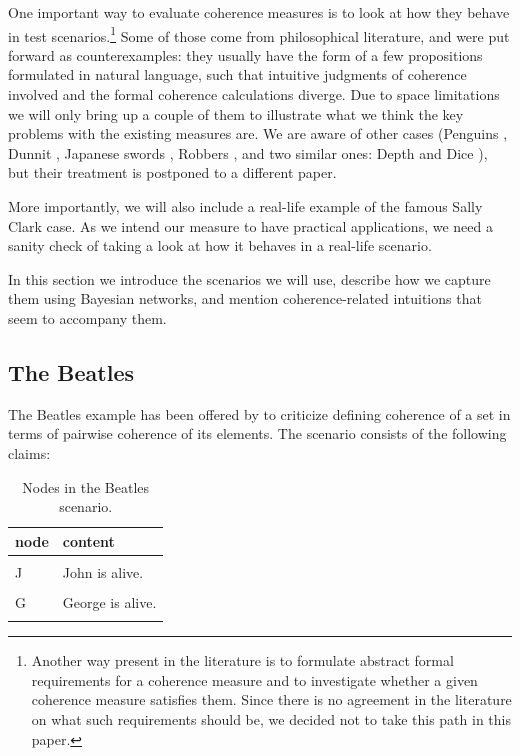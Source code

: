 \documentclass[10pt,]{scrartcl}
\begin{document}
One important way to evaluate coherence measures is to look at how they behave in test scenarios.\footnote{Another way present in the literature is to formulate abstract formal requirements for a coherence measure and to investigate whether a given coherence measure satisfies them. Since there is no agreement in the literature on what such requirements should be, we decided not to take this path in this paper.}
 Some of those come from philosophical literature, and were put forward as counterexamples: they usually have the form of a few propositions formulated in natural language, such that intuitive judgments of coherence involved and the formal coherence calculations  diverge.  Due to space limitations we will only bring up a couple of them to illustrate what we think the key problems with the existing measures are. We are aware of other cases (Penguins \citep{bovens2004bayesian,Meijs2007Alleged},  Dunnit \citep{Merricks1995}, 
Japanese swords \citep{Meijs2007Alleged}, 
Robbers \citep{Siebel2004On-Fitelsons-me},
and two similar ones: Depth and 
Dice  \citep{Akiba2000Shogenjis,Shogenji2001Reply,Schippers2019General}), but their  treatment is postponed to a different paper.

More importantly, we will also include a real-life example of the famous Sally Clark case. As we intend our measure to have practical applications, we need a sanity check of taking a look at how it behaves in a real-life scenario. 

 In this section we introduce the scenarios we will use, describe how we capture them using Bayesian networks, and mention coherence-related intuitions that seem to accompany them. 







\subsection{The Beatles}

 The Beatles example has been offered by \citet[339]{shogenji1999conducive} to criticize defining coherence of a set in terms of   pairwise coherence of its elements.   The scenario consists of the following claims:

\begin{table}[H]
\centering
\begin{tabular}{ll}
\toprule
node & content\\
\midrule
\cellcolor{gray!6}{D} & \cellcolor{gray!6}{Exactly one of the Beatles (John, Paul, George and Ringo) is dead.}\\
J & John is alive.\\
\cellcolor{gray!6}{P} & \cellcolor{gray!6}{Paul is alive.}\\
G & George is alive.\\
\cellcolor{gray!6}{R} & \cellcolor{gray!6}{Ringo is alive.}\\
\bottomrule
\end{tabular}
\caption{Nodes in the Beatles scenario.}
\label{tab:beatles}
\end{table}
\end{document}
